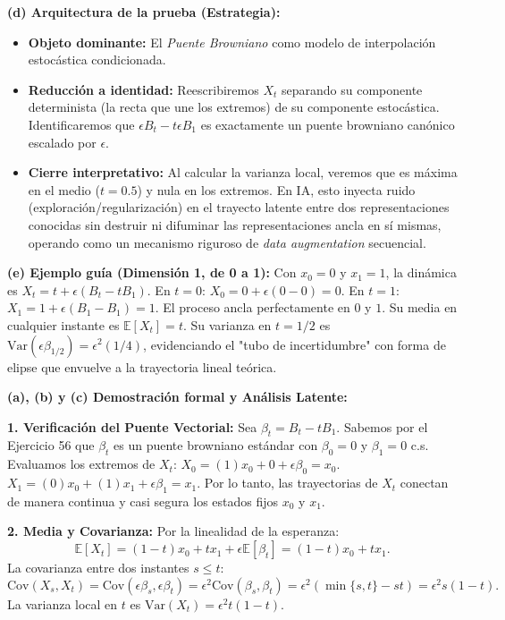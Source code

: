 \documentclass[11pt, letterpaper]{article}
\begin{document}
\begin{solucion}
    \textbf{(d) Arquitectura de la prueba (Estrategia):}
    \begin{itemize}
        \item[(i)] \textbf{Objeto dominante:} El \textit{Puente Browniano} como modelo de interpolación estocástica condicionada.
        \item[(ii)] \textbf{Reducción a identidad:} Reescribiremos $X_t$ separando su componente determinista (la recta que une los extremos) de su componente estocástica. Identificaremos que $\epsilon B_t - t\epsilon B_1$ es exactamente un puente browniano canónico escalado por $\epsilon$.
        \item[(iii)] \textbf{Cierre interpretativo:} Al calcular la varianza local, veremos que es máxima en el medio ($t=0.5$) y nula en los extremos. En IA, esto inyecta ruido (exploración/regularización) en el trayecto latente entre dos representaciones conocidas sin destruir ni difuminar las representaciones ancla en sí mismas, operando como un mecanismo riguroso de \textit{data augmentation} secuencial.
    \end{itemize}

    \vspace{3mm}
    \textbf{(e) Ejemplo guía (Dimensión 1, de 0 a 1):}
    Con $x_0 = 0$ y $x_1 = 1$, la dinámica es $X_t = t + \epsilon(B_t - tB_1)$.
    En $t=0$: $X_0 = 0 + \epsilon(0 - 0) = 0$.
    En $t=1$: $X_1 = 1 + \epsilon(B_1 - B_1) = 1$.
    El proceso ancla perfectamente en $0$ y $1$. Su media en cualquier instante es $\mathbb{E}[X_t] = t$. Su varianza en $t=1/2$ es $\text{Var}(\epsilon \beta_{1/2}) = \epsilon^2 (1/4)$, evidenciando el "tubo de incertidumbre" con forma de elipse que envuelve a la trayectoria lineal teórica.

    \textbf{(a), (b) y (c) Demostración formal y Análisis Latente:}

    \textbf{1. Verificación del Puente Vectorial:}
    Sea $\beta_t = B_t - tB_1$. Sabemos por el Ejercicio 56 que $\beta_t$ es un puente browniano estándar con $\beta_0 = 0$ y $\beta_1 = 0$ c.s.
    Evaluamos los extremos de $X_t$:
    $X_0 = (1)x_0 + 0 + \epsilon \beta_0 = x_0$.
    $X_1 = (0)x_0 + (1)x_1 + \epsilon \beta_1 = x_1$.
    Por lo tanto, las trayectorias de $X_t$ conectan de manera continua y casi segura los estados fijos $x_0$ y $x_1$.

    \textbf{2. Media y Covarianza:}
    Por la linealidad de la esperanza:
    \[ \mathbb{E}[X_t] = (1-t)x_0 + tx_1 + \epsilon \mathbb{E}[\beta_t] = (1-t)x_0 + tx_1. \]
    La covarianza entre dos instantes $s \le t$:
    \[ \text{Cov}(X_s, X_t) = \text{Cov}(\epsilon \beta_s, \epsilon \beta_t) = \epsilon^2 \text{Cov}(\beta_s, \beta_t) = \epsilon^2 (\min\{s, t\} - st) = \epsilon^2 s(1-t). \]
    La varianza local en $t$ es $\text{Var}(X_t) = \epsilon^2 t(1-t)$.


\end{solucion}
\end{document}
